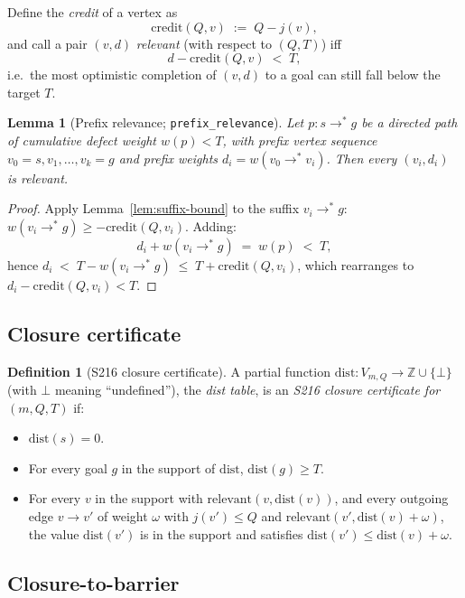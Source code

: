 \documentclass[11pt,a4paper]{article}
\theoremstyle{plain}
\newtheorem{lemma}[theorem]{Lemma}
\theoremstyle{definition}
\newtheorem{definition}[theorem]{Definition}
\newcommand{\ZZ}{\mathbb{Z}}
\newcommand{\credit}{\mathrm{credit}}
\newcommand{\relevant}{\mathrm{relevant}}
\begin{document}
Define the \emph{credit} of a vertex as
\[
  \credit(Q, v) \;:=\; Q - j(v),
\]
and call a pair $(v, d)$ \emph{relevant} (with respect to
$(Q, T)$) iff
\[
  d - \credit(Q, v) \;<\; T,
\]
i.e.\ the most optimistic completion of $(v, d)$ to a goal can still
fall below the target $T$.

\begin{lemma}[Prefix relevance; \texttt{prefix\_relevance}]
\label{lem:prefix-relevance}
Let $p : s \to^{*} g$ be a directed path of cumulative defect weight
$w(p) < T$, with prefix vertex sequence
$v_0 = s, v_1, \dots, v_k = g$ and prefix weights
$d_i = w(v_0 \to^{*} v_i)$. Then every $(v_i, d_i)$ is relevant.
\end{lemma}

\begin{proof}
Apply Lemma~\ref{lem:suffix-bound} to the suffix $v_i \to^* g$:
$w(v_i \to^{*} g) \ge -\credit(Q, v_i)$. Adding:
\[
  d_i + w(v_i \to^{*} g) \;=\; w(p) \;<\; T,
\]
hence
$d_i \;<\; T - w(v_i \to^{*} g) \;\le\; T + \credit(Q, v_i)$,
which rearranges to $d_i - \credit(Q, v_i) < T$.
\end{proof}

\subsection{Closure certificate}

\begin{definition}[S216 closure certificate]
\label{def:s216-cert}
A partial function
\(
   \mathrm{dist} : V_{m, Q} \to \ZZ \cup \{\bot\}
\)
(with $\bot$ meaning ``undefined''), the \emph{dist table}, is an
\emph{S216 closure certificate for $(m, Q, T)$} if:
\begin{itemize}
  \item[(C1)] $\mathrm{dist}(s) = 0$.
  \item[(C2)] For every goal $g$ in the support of $\mathrm{dist}$,
        $\mathrm{dist}(g) \ge T$.
  \item[(C3)] For every $v$ in the support with
        $\relevant(v, \mathrm{dist}(v))$, and every outgoing edge
        $v \to v'$ of weight $\omega$ with $j(v') \le Q$ and
        $\relevant(v', \mathrm{dist}(v) + \omega)$, the value
        $\mathrm{dist}(v')$ is in the support and satisfies
        $\mathrm{dist}(v') \le \mathrm{dist}(v) + \omega$.
\end{itemize}
\end{definition}

\subsection{Closure-to-barrier}
\end{document}
